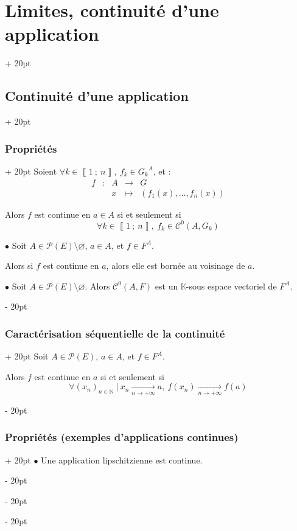 \documentclass[a4paper, 12pt, twoside]{article}
\newcommand{\N}{\mathbb{N}} %
\newcommand{\K}{\mathbb K}
\newcommand{\nset}[2]{\left\llbracket #1\ ;\ #2 \right\rrbracket}
\newcommand{\tendsto}[1]{\xrightarrow[#1]{}}
\newcommand{\lr}[1]{\left( #1 \right)}
\newcommand{\ind}[1][20pt]{\advance\leftskip + #1}
\newcommand{\deind}[1][20pt]{\advance\leftskip - #1}
\newenvironment{indt}[2][20pt]{#2 \par \ind[#1]}{\par \deind} %
\begin{document}
\begin{indt}{\section{Limites, continuité d'une application}}
\begin{indt}{\subsection{Continuité d'une application}}
\begin{indt}{\subsubsection{Propriétés}}
                Soient $\forall k \in \nset 1 n,\ f_k \in {G_k}^A$, et :
                \[
                    \begin{array}{ccccc}
                        f & : & A & \longrightarrow & G
                        \\
                          && x & \longmapsto & \lr{f_1(x), \ldots, f_n(x)}
                    \end{array}
                \]

                Alors $f$ est continue en $a \in A$ si et seulement si
                \[
                    \forall k \in \nset 1 n,\
                    f_k \in \mathcal C^0(A, G_k)
                \]

                \vspace{12pt}
                
                $\bullet$ Soit $A \in \mathcal P(E) \setminus \varnothing$, $a \in A$, et $f \in F^A$.

                Alors si $f$ est continue en $a$, alors elle est bornée au voisinage de $a$.

                \vspace{12pt}
                
                $\bullet$ Soit $A \in \mathcal P(E) \setminus \varnothing$. Alors $\mathcal C^0(A, F)$ est un $\K$-sous espace vectoriel de $F^A$.
            \end{indt}

            \vspace{12pt}
            
            \begin{indt}{\subsubsection{Caractérisation séquentielle de la continuité}}
                Soit $A \in \mathcal P(E)$, $a \in A$, et $f \in F^A$.

                Alors $f$ est continue en $a$ si et seulement si
                \[
                    \forall \lr{x_n}_{n \in \N}\ |\ x_n \tendsto{n \to +\infty} a,\
                    f(x_n) \tendsto{n \to +\infty} f(a)
                \]
            \end{indt}

            \vspace{12pt}
            
            \begin{indt}{\subsubsection{Propriétés (exemples d'applications continues)}}
                $\bullet$ Une application lipschitzienne est continue.


\end{indt}
\end{indt}
\end{indt}
\end{document}
